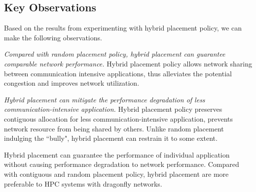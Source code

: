 \subsection{Key Observations}

Based on the results from experimenting with hybrid placement policy, we can make the following observations.

\emph{Compared with random placement policy, hybrid placement can guarantee comparable network performance.} Hybrid placement policy allows network sharing between communication intensive applications, thus alleviates the potential congestion and improves network utilization.

\emph{Hybrid placement can mitigate the performance degradation of less communication-intensive application.} Hybrid placement policy preserves contiguous allocation for less communication-intensive application, prevents network resource from being shared by others. Unlike random placement indulging the ``bully", hybrid placement can restrain it to some extent.

Hybrid placement can guarantee the performance of individual application without causing performance degradation to network performance. Compared with contiguous and random placement policy, hybrid placement are more preferable to HPC systems with dragonfly networks.


